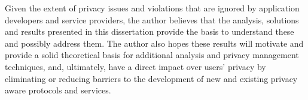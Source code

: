 Given the extent of privacy issues and violations that are ignored by application developers and service providers, the author believes that the analysis, solutions and results presented in this dissertation provide the basis to understand these and possibly address them.
The author also hopes these results will motivate and provide a solid theoretical basis for additional analysis and privacy management techniques, and, ultimately, have a direct impact over users' privacy by eliminating or reducing barriers to the development of new and existing privacy aware protocols and services.
